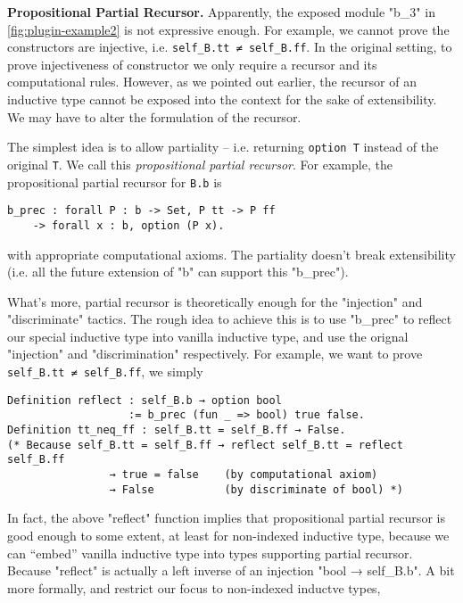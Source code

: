 \textbf{Propositional Partial Recursor.}
Apparently, the exposed module "b_3" in \cref*{fig:plugin-example2} is not expressive enough. For example, we cannot prove the constructors are injective, i.e. \texttt{self_B.tt ≠ self_B.ff}. In the original setting, to prove injectiveness of constructor we only require a recursor and its computational rules. However, as we pointed out earlier, the recursor of an inductive type cannot be exposed into the context for the sake of extensibility. We may have to alter the formulation of the recursor.


The simplest idea is to allow partiality -- i.e. returning \texttt{option T} instead of the original \texttt{T}. We call this \textit{propositional partial recursor}. For example, the propositional partial recursor for \texttt{B.b} is 
\begin{verbatim}
b_prec : forall P : b -> Set, P tt -> P ff 
    -> forall x : b, option (P x). 
\end{verbatim}
with appropriate computational axioms. The partiality doesn't break extensibility (i.e. all the future extension of "b" can support this "b_prec"). 

What's more, partial recursor is theoretically enough for the "injection" and "discriminate" tactics. The rough idea to achieve this is to use "b_prec" to reflect our special inductive type into vanilla inductive type, and use the orignal "injection" and "discrimination" respectively. For example, we want to prove \texttt{self_B.tt ≠ self_B.ff}, we simply 
\begin{verbatim}
Definition reflect : self_B.b → option bool 
                   := b_prec (fun _ => bool) true false.
Definition tt_neq_ff : self_B.tt = self_B.ff → False.
(* Because self_B.tt = self_B.ff → reflect self_B.tt = reflect self_B.ff 
                → true = false    (by computational axiom)
                → False           (by discriminate of bool) *)
\end{verbatim}



In fact, the above "reflect" function implies that propositional partial recursor is good enough to some extent, at least for non-indexed inductive type, because we can ``embed'' vanilla inductive type into types supporting partial recursor. Because "reflect" is actually a left inverse of an injection "bool → self_B.b". A bit more formally, and restrict our focus to non-indexed inductve types,

